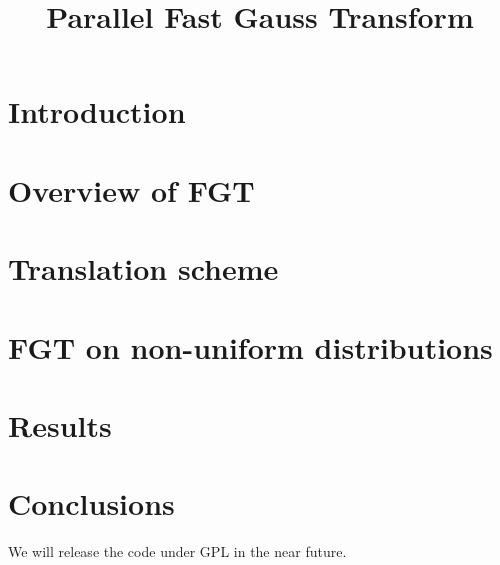 \documentclass[conference]{IEEEtran}
\begin{document}
\title{Parallel Fast Gauss Transform}  


\author{

\and
{}

\and
{}
}
\date{}
\maketitle

\begin{abstract}

\end{abstract}

\section{Introduction}  
\label{s:intro}

%
\section{Overview of FGT} 
\label{sc:fgt}

%
\section{Translation scheme} 
\label{sc:sweep}

%
\section{FGT on non-uniform distributions} 
\label{sc:nonuniform}


\section{Results}
\label{sc:results}


\section{Conclusions}
\label{sc:conclusions}
We will release the code under GPL in the near future. 
\end{document}
